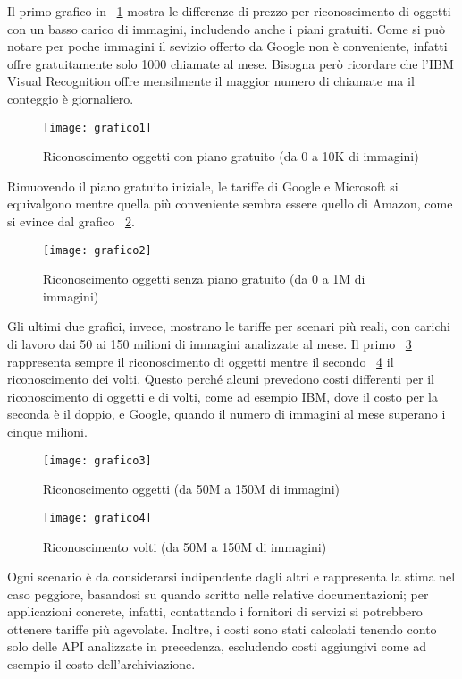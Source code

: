 Il primo grafico in ~\ref{fig:grafico1} mostra le differenze di prezzo per riconoscimento di oggetti con un basso carico di immagini, includendo anche i piani gratuiti.
Come si può notare per poche immagini il sevizio offerto da Google non è conveniente, infatti offre gratuitamente solo 1000 chiamate al mese. 
Bisogna però ricordare che l'IBM Visual Recognition offre mensilmente il maggior numero di chiamate ma il conteggio è giornaliero. 
\begin{figure}[!h]
\begin{center}
	\texttt{[image: grafico1]}
{\scriptsize
\caption{Riconoscimento oggetti con piano gratuito (da 0 a 10K di immagini)}
\label{fig:grafico1}}
\end{center}
\end{figure}
%
%
Rimuovendo il piano gratuito iniziale, le tariffe di Google e Microsoft si equivalgono mentre quella più conveniente sembra essere quello di Amazon,
come si evince dal grafico ~\ref{fig:grafico2}.
\begin{figure}[!h]
\begin{center}
	\texttt{[image: grafico2]} 
{\scriptsize \caption{Riconoscimento oggetti senza piano gratuito (da 0 a 1M di immagini)}
\label{fig:grafico2}}
\end{center}
\end{figure}
%
%
Gli ultimi due grafici, invece, mostrano le tariffe per scenari più reali, con carichi di lavoro dai 50 ai 150 milioni di immagini analizzate al mese.
Il primo ~\ref{fig:grafico3} rappresenta sempre il riconoscimento di oggetti mentre il secondo ~\ref{fig:grafico4} il riconoscimento dei volti.
Questo perché alcuni prevedono costi differenti per il riconoscimento di oggetti e di volti, come ad esempio IBM, dove il costo per la seconda è il doppio,
e Google, quando il numero di immagini al mese superano i cinque milioni.
\begin{figure}[!h]
\begin{center}
	\texttt{[image: grafico3]} 
{\scriptsize \caption{Riconoscimento oggetti (da 50M a 150M di immagini)}
\label{fig:grafico3}}
\end{center}
\end{figure}
%
\begin{figure}[!h]
\begin{center}
	\texttt{[image: grafico4]} 
{\scriptsize \caption{Riconoscimento volti (da 50M a 150M di immagini)}
\label{fig:grafico4}}
\end{center}
\end{figure}
%
%

Ogni scenario è da considerarsi indipendente dagli altri e rappresenta la stima nel caso peggiore, basandosi su quando scritto nelle relative documentazioni;
per applicazioni concrete, infatti, contattando i fornitori di servizi si potrebbero ottenere tariffe più agevolate.
Inoltre, i costi sono stati calcolati tenendo conto solo delle API analizzate in precedenza, escludendo costi aggiungivi come ad esempio il costo dell'archiviazione.
%
%